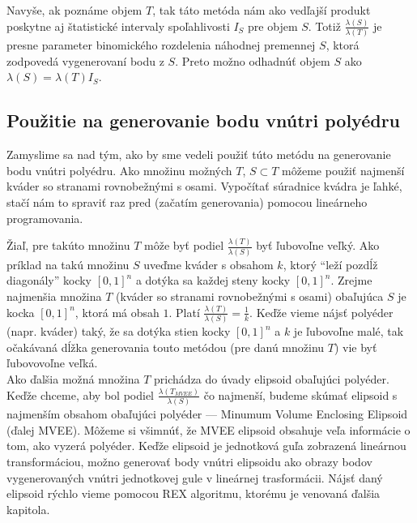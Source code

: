 Navyše, ak poznáme objem $T$, tak táto metóda nám ako vedľajší produkt poskytne aj štatistické intervaly spoľahlivosti $I_S$ pre objem $S$. Totiž $\frac{\lambda(S)}{\lambda(T)}$ je presne parameter binomického rozdelenia náhodnej premennej $S$, ktorá zodpovedá vygenerovaní bodu z $S$. Preto možno odhadnúť objem $S$ ako $\lambda(S)=\lambda(T)I_S$.

\subsection{Použitie na generovanie bodu vnútri polyédru}

Zamyslime sa nad tým, ako by sme vedeli použiť túto metódu na generovanie bodu vnútri polyédru. Ako množinu možných $T$, $S \subset T$ môžeme použiť najmenší kváder so stranami rovnobežnými s osami. Vypočítať súradnice kvádra je ľahké, stačí nám to spraviť raz pred (začatím generovania) pomocou lineárneho programovania.

Žiaľ, pre takúto množinu $T$ môže byť podiel $\frac{\lambda(T)}{\lambda(S)}$ byť ľubovoľne veľký. Ako príklad na takú množinu $S$ uveďme kváder s obsahom $k$, ktorý ``leží pozdĺž diagonály'' kocky $[0,1]^n$ a dotýka sa každej steny kocky $[0,1]^n$. Zrejme najmenšia množina $T$ (kváder so stranami rovnobežnými s osami) obaľujúca $S$ je kocka $[0,1]^n$, ktorá má obsah $1$. Platí $\frac{\lambda(T)}{\lambda(S)}=\frac{1}{k}$. Keďže vieme nájsť polyéder (napr. kváder) taký, že sa dotýka stien kocky $[0,1]^n$ a $k$ je ľubovoľne malé, tak očakávaná dĺžka generovania touto metódou (pre danú množinu $T$) vie byť ľubovovoľne veľká.\\

Ako ďalšia možná množina $T$ prichádza do úvady elipsoid obaľujúci polyéder. Keďže chceme, aby bol podiel $\frac{\lambda(T_{MVEE})}{\lambda(S)}$ čo najmenší, budeme skúmať elipsoid s najmenším obsahom obaľujúci polyéder --- Minumum Volume Enclosing Elipsoid (ďalej MVEE). Môžeme si všimnúť, že MVEE elipsoid obsahuje veľa informácie o tom, ako vyzerá polyéder. Keďže elipsoid je jednotková guľa zobrazená lineárnou transformáciou, možno generovať body vnútri elipsoidu ako obrazy bodov vygenerovaných vnútri jednotkovej gule v lineárnej trasformácii. Nájsť daný elipsoid rýchlo vieme pomocou REX algoritmu, ktorému je venovaná ďalšia kapitola.

